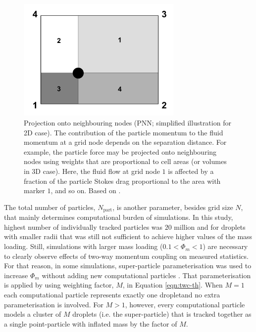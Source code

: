 \documentclass{pracamgren}
\begin{document}
\begin{figure}[ht]
\centering
\includegraphics[width=8cm]{figures/1-03_pnn.pdf}
\caption{
Projection onto neighbouring nodes (PNN; simplified illustration for 2D case).
The contribution of the particle momentum to the fluid momentum at a grid node depends on the separation distance.
For example, the particle force may be projected onto neighbouring nodes using weights that are proportional to cell areas (or volumes in 3D case).
Here, the fluid flow at grid node $1$ is affected by a fraction of the particle Stokes drag proportional to the area with marker $1$, and so on.
Based on \textcite[Fig. 1 therein]{Garg2007}.}
\label{fig:pnn}
\end{figure}

\medskip

The total number of particles, $N_{\text{part}}$, is another parameter, besides grid size $N$, that mainly determines computational burden of simulations.
In this study, highest number of individually tracked particles was $20$ million and for droplets with smaller radii that was still not sufficient to achieve higher values of the mass loading.
Still, simulations with larger mass loading ($0.1 < \Phi_{m} < 1$) are necessary to clearly observe effects of two-way momentum coupling on measured statistics.
For that reason, in some simulations, super-particle parameterisation was used to increase $\Phi_m$ without adding new computational particles \parencite{Elghobashi1994}.
That parameterisation is applied by using weighting factor, $M$, in Equation \ref{eqn:twc-th}.
When $M=1$ each computational particle represents exactly one dropletand no extra parameterisation is involved.
For $M > 1$, however, every computational particle models a cluster of $M$ droplets (i.e. the super-particle) that is tracked together as a single point-particle with inflated mass by the factor of $M$.
\end{document}
